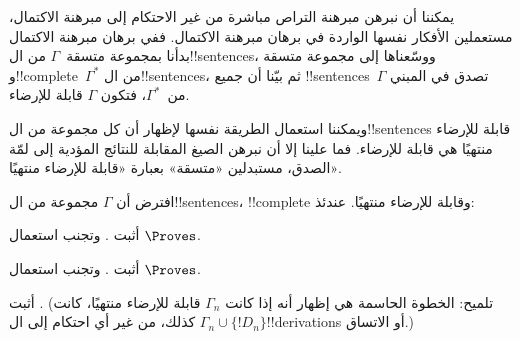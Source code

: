 \documentclass[../../../include/open-logic-section]{subfiles}
\begin{document}
      {}
      {}


يمكننا أن نبرهن مبرهنة التراص مباشرة من غير الاحتكام إلى مبرهنة
الاكتمال، مستعملين الأفكار نفسها
الواردة في برهان مبرهنة الاكتمال. ففي برهان مبرهنة الاكتمال بدأنا
بمجموعة متسقة~$\Gamma$ من ال!!{sentence}s، ووسّعناها إلى مجموعة
متسقة و!!{complete}~$\Gamma^*$ من
ال!!{sentence}s، ثم بيّنا أن جميع !!{sentence}s~$\Gamma$ تصدق في
المبني من~$\Gamma^*$، فتكون $\Gamma$ قابلة للإرضاء.

ويمكننا استعمال الطريقة نفسها لإظهار أن كل مجموعة من ال!!{sentence}s
قابلة للإرضاء منتهيًا هي قابلة للإرضاء. فما علينا إلا أن نبرهن الصيغ
المقابلة للنتائج المؤدية إلى لمّة الصدق، مستبدلين «متسقة» بعبارة
«قابلة للإرضاء منتهيًا».

\begin{prop}
افترض أن $\Gamma$ مجموعة من ال!!{sentence}s، !!{complete} وقابلة للإرضاء
منتهيًا. عندئذ:
\begin{enumerate}


\end{enumerate}
\end{prop}

\begin{prob}
أثبت . وتجنب استعمال $\Proves$.
\end{prob}
\tagendprob

\begin{prob}
أثبت . وتجنب استعمال $\Proves$.
\end{prob}
\tagendprob


\begin{prob}
أثبت . (تلميح: الخطوة الحاسمة هي
إظهار أنه إذا كانت $\Gamma_n$ قابلة للإرضاء منتهيًا، كانت
$\Gamma_n \cup \{!D_n\}$ كذلك، من غير أي احتكام إلى ال!!{derivation}s
أو الاتساق.)
\end{prob}
\tagendprob
\end{document}
